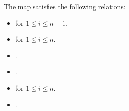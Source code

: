 \documentclass[10pt,a4paper]{amsart}
\begin{document}
\begin{Proposition}\label{relations for connecting maps}
 The map  satisfies the following relations:
 \begin{itemize}
\itemsep=0pt
 \item {} for $1\leq i \leq n-1$.
 \item {} for $1\leq i \leq n$.
 \item {}.
 \item {}.
 \item {} for $1\leq i \leq n$.
 \item {}.
 \end{itemize}
\end{Proposition}
\end{document}
